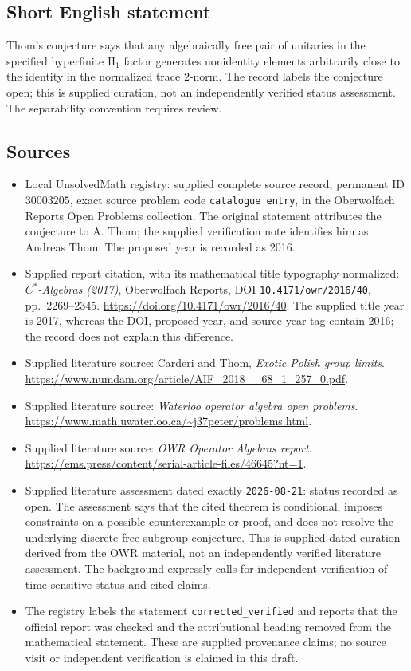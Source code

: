 \documentclass[11pt]{article}
\begin{document}
\subsection{Short English statement}
Thom's conjecture says that any algebraically free pair of unitaries in the specified hyperfinite \(\mathrm{II}_1\) factor generates nonidentity elements arbitrarily close to the identity in the normalized trace \(2\)-norm. The record labels the conjecture open; this is supplied curation, not an independently verified status assessment. The separability convention requires review.
\subsection{Sources}
\begin{itemize}
\item Local UnsolvedMath registry: supplied complete source record, permanent ID \(30003205\), exact source problem code \texttt{catalogue entry}, in the Oberwolfach Reports Open Problems collection. The original statement attributes the conjecture to A. Thom; the supplied verification note identifies him as Andreas Thom. The proposed year is recorded as 2016.
\item Supplied report citation, with its mathematical title typography normalized: \emph{\(C^*\)-Algebras (2017)}, Oberwolfach Reports, DOI \texttt{10.4171/owr/2016/40}, pp.\ 2269--2345. \url{https://doi.org/10.4171/owr/2016/40}. The supplied title year is 2017, whereas the DOI, proposed year, and source year tag contain 2016; the record does not explain this difference.
\item Supplied literature source: Carderi and Thom, \emph{Exotic Polish group limits}. \url{https://www.numdam.org/article/AIF_2018__68_1_257_0.pdf}.
\item Supplied literature source: \emph{Waterloo operator algebra open problems}. \url{https://www.math.uwaterloo.ca/~j37peter/problems.html}.
\item Supplied literature source: \emph{OWR Operator Algebras report}. \url{https://ems.press/content/serial-article-files/46645?nt=1}.
\item Supplied literature assessment dated exactly \texttt{2026-08-21}: status recorded as open. The assessment says that the cited theorem is conditional, imposes constraints on a possible counterexample or proof, and does not resolve the underlying discrete free subgroup conjecture. This is supplied dated curation derived from the OWR material, not an independently verified literature assessment. The background expressly calls for independent verification of time-sensitive status and cited claims.
\item The registry labels the statement \texttt{corrected\_verified} and reports that the official report was checked and the attributional heading removed from the mathematical statement. These are supplied provenance claims; no source visit or independent verification is claimed in this draft.
\end{itemize}
\end{document}
